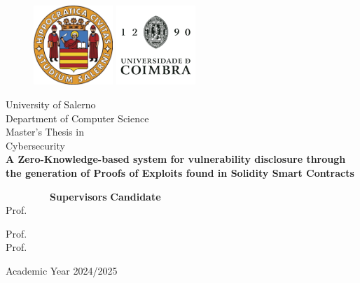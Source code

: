 \documentclass[11pt,a4paper]{report}
\begin{document}
\pagestyle{fancy}
\fancyfoot[C]{\thepage}

\begin{titlepage}
    \begin{center}
        \begin{figure}
            \includegraphics[width=3cm, height=3cm]{Images/unisaLogo.png}
            \centering
            \includegraphics[width=3cm, height=3cm]{Images/coimbra_logo.png}
            \centering
        \end{figure}
        {\Large University of Salerno}\\[0.2truecm]
        {\large Department of Computer Science}\\
        \hrulefill
        \vfill
        {\large Master's Thesis in}\\[0.2truecm]
        
        {\large Cybersecurity}\\
        \vfill\vfill
        {\LARGE {\bf A Zero-Knowledge-based system for vulnerability disclosure through the generation of Proofs of Exploits found in Solidity Smart Contracts \\[0.4truecm]}}
        
        \vfill\vfill
        
        \ \ \ \ \ \ \ \ \ {\bf Supervisors} \hfill {\bf Candidate}\ \ \\
        Prof.  \hfill  {} 
        \begin{flushleft}
        Prof.  \\
        Prof. 
        \end{flushleft}
        
        \vfill
        \hrulefill 
        \begin{center} Academic Year 2024/2025 \end{center}
        
    \end{center}
\end{titlepage}
\end{document}
